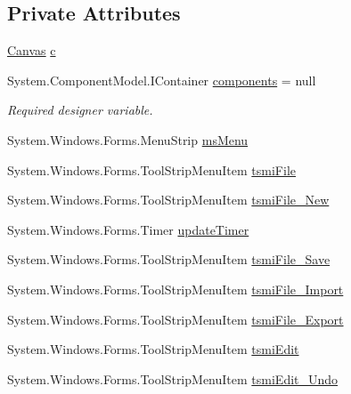 \subsection*{Private Attributes}
\begin{DoxyCompactItemize}
\item 
\mbox{\hyperlink{class_paint___program_1_1_canvas}{Canvas}} \mbox{\hyperlink{class_paint___program_1_1_form1_ae97aba2c6b8ee08da0b3af7bd7943c4a}{c}}
\item 
System.\+Component\+Model.\+I\+Container \mbox{\hyperlink{class_paint___program_1_1_form1_a95d0a7a8fc7be660e77f445b4562cd2f}{components}} = null
\begin{DoxyCompactList}\small\item\em Required designer variable. \end{DoxyCompactList}\item 
System.\+Windows.\+Forms.\+Menu\+Strip \mbox{\hyperlink{class_paint___program_1_1_form1_a2ec5d48907647eb6f3385b7e567d2a20}{ms\+Menu}}
\item 
System.\+Windows.\+Forms.\+Tool\+Strip\+Menu\+Item \mbox{\hyperlink{class_paint___program_1_1_form1_a82f2c6d2129b75a00b4743e4e8bc10f6}{tsmi\+File}}
\item 
System.\+Windows.\+Forms.\+Tool\+Strip\+Menu\+Item \mbox{\hyperlink{class_paint___program_1_1_form1_af4f5842df653b0c2601897af26b651c9}{tsmi\+File\+\_\+\+New}}
\item 
System.\+Windows.\+Forms.\+Timer \mbox{\hyperlink{class_paint___program_1_1_form1_acecdd498b40a257daf3424d49e172a9d}{update\+Timer}}
\item 
System.\+Windows.\+Forms.\+Tool\+Strip\+Menu\+Item \mbox{\hyperlink{class_paint___program_1_1_form1_a9164e5083cda36098e27bb7efcae5789}{tsmi\+File\+\_\+\+Save}}
\item 
System.\+Windows.\+Forms.\+Tool\+Strip\+Menu\+Item \mbox{\hyperlink{class_paint___program_1_1_form1_aa972312f80850f6519a48e363c504835}{tsmi\+File\+\_\+\+Import}}
\item 
System.\+Windows.\+Forms.\+Tool\+Strip\+Menu\+Item \mbox{\hyperlink{class_paint___program_1_1_form1_ad340dfd4c776702545d1261d02b2cb9d}{tsmi\+File\+\_\+\+Export}}
\item 
System.\+Windows.\+Forms.\+Tool\+Strip\+Menu\+Item \mbox{\hyperlink{class_paint___program_1_1_form1_af08d32364512b4ad007a3ea94f61bd8f}{tsmi\+Edit}}
\item 
System.\+Windows.\+Forms.\+Tool\+Strip\+Menu\+Item \mbox{\hyperlink{class_paint___program_1_1_form1_a2343678a0dc95da2347f6f12a2b6aabf}{tsmi\+Edit\+\_\+\+Undo}}

\end{DoxyCompactItemize}
